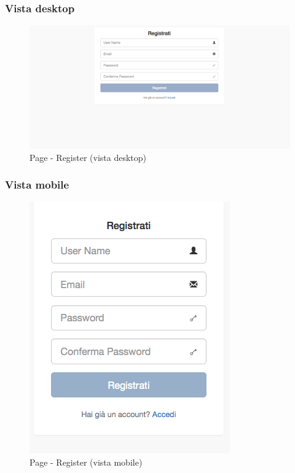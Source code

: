 		\subsubsection{Vista desktop} %
		\begin{figure}[htbp]
			\centering
			\centerline{\includegraphics[scale=0.4]{./images/mockup/register_vd.pdf}}
			\caption{Page - Register (vista desktop)}
		\end{figure}

		\subsubsection{Vista mobile} %
		\begin{figure}[htbp]
			\centering
			\centerline{\includegraphics[scale=0.5]{./images/mockup/register_vm.png}}
			\caption{Page - Register (vista mobile)}
		\end{figure}


